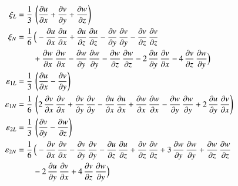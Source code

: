 \begin{subequations}
	\begin{align}
	  \xi_{L} & = \frac{1}{3} \, \left( {\frac{\partial u}{\partial x}} +  {\frac{\partial v}{\partial y}} +  {\frac{\partial w}{\partial z}}\right)\\
	  \xi_{N} & = \frac{1}{6} \, \Big(- {\frac{\partial u}{\partial x}}\,  {\frac{\partial u}{\partial x}} +  {\frac{\partial u}{\partial z}}\,  {\frac{\partial u}{\partial z}}  -  {\frac{ \partial v}{\partial y}}\,  {\frac{ \partial v}{\partial y}} -  {\frac{\partial v}{\partial z}}\,  {\frac{\partial v}{\partial z}} \notag \\
    \mbox{} & \qquad + 
     {\frac{\partial w}{\partial x}}\,  {\frac{\partial w}{\partial x}} -  {\frac{\partial w}{\partial y}}\,  {\frac{\partial w}{\partial y}} -  {\frac{\partial w}{\partial z}}\,  {\frac{\partial w}{\partial z}} - 2 \,  {\frac{\partial u}{\partial y}}\,  {\frac{\partial v}{\partial x}} - 4 \,  {\frac{\partial v}{\partial z}}\,  {\frac{\partial w}{\partial y}} \Big)\\
	  \varepsilon_{1L} & = \frac{1}{3} \, \left( {\frac{\partial u}{\partial x}} -  {\frac{\partial v}{\partial y}}\right)\\
	  \varepsilon_{1N} & = \frac{1}{6} \, \left(2 \,  {\frac{\partial v}{\partial x}}\,  {\frac{\partial v}{\partial x}} +  {\frac{ \partial v}{\partial y}}\,  {\frac{ \partial v}{\partial y}} -  {\frac{\partial u}{\partial x}}\,  {\frac{\partial u}{\partial x}} +   {\frac{\partial w}{\partial x}}\,  {\frac{\partial w}{\partial x}} -   {\frac{\partial w}{\partial y}}\,  {\frac{\partial w}{\partial y}} + 2 \,  {\frac{\partial u}{\partial y}}\,  {\frac{\partial v}{\partial x}}\right)\\
	  \varepsilon_{2L} & = \frac{1}{3} \, \left( {\frac{\partial v}{\partial y}} -  {\frac{\partial w}{\partial z}}\right)\\
	  \varepsilon_{2N} & = \frac{1}{6} \, \Big(-  {\frac{\partial v}{\partial x}}\,  {\frac{\partial v}{\partial x}} -  {\frac{ \partial v}{\partial y}}\,  {\frac{ \partial v}{\partial y}} -  {\frac{\partial u}{\partial z}}\,  {\frac{\partial u}{\partial z}} +  {\frac{\partial v}{\partial z}}\,  {\frac{\partial v}{\partial z}} + 3 \,   {\frac{\partial w}{\partial y}}\,  {\frac{\partial w}{\partial y}} +   {\frac{\partial w}{\partial z}}\,  {\frac{\partial w}{\partial z}}  \notag \\
	\mbox{} & \qquad - 2 \,  {\frac{\partial u}{\partial y}}\,  {\frac{\partial v}{\partial x}} + 4 \,  {\frac{\partial v}{\partial z}}\,  {\frac{\partial w}{\partial y}}\Big)\\

\end{align}
\end{subequations}
